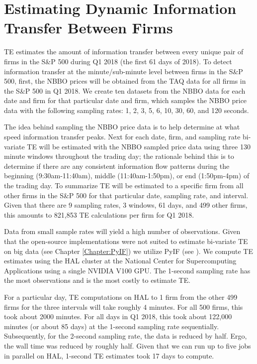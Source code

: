\section{Estimating Dynamic Information Transfer Between Firms}

TE estimates the amount of information transfer between every unique pair of firms in the S\&P 500 during Q1 2018 (the first 61 days of 2018). To detect information transfer at the minute/sub-minute level between firms in the S\&P 500, first, the NBBO prices will be obtained from the TAQ data for all firms in the S\&P 500 in Q1 2018.  We create ten datasets from the NBBO data for each date and firm for that particular date and firm, which samples the NBBO price data with the following sampling rates: 1,  2,  3,  5,  6,  10,  30,  60,  and 120 seconds.

The idea behind sampling the NBBO price data is to help determine at what speed information transfer peaks.  Next for each date,  firm, and sampling rate bi-variate TE will be estimated with the NBBO sampled price data using three 130 minute windows throughout the trading day; the rationale behind this is to determine if there are any consistent information flow patterns during the beginning (9:30am-11:40am), middle (11:40am-1:50pm), or end (1:50pm-4pm) of the trading day.  To summarize TE will be estimated to a specific firm from all other firms in the S\&P 500 for that particular date,  sampling rate,  and interval.  Given that there are 9 sampling rates,  3 windows,  61 days,  and 499 other firms, this amounts to 821,853 TE calculations per firm for Q1 2018. 

Data from small sample rates will yield a high number of observations.  Given that the open-source implementations were not suited to estimate bi-variate TE on big data (see Chapter \ref{Chapter:PyIF}) we utilize PyIF (see \cite{PyIF}).  We compute TE estimates using the HAL cluster at the National Center for Supercomputing Applications using a single NVIDIA V100 GPU. The 1-second sampling rate has the most observations and is the most costly to estimate TE. 

For a particular day,  TE computations on HAL to 1 firm from the other 499 firms for the three intervals will take roughly 4 minutes.  For all 500 firms, this took about 2000 minutes.  For all days in Q1 2018, this took about 122,000 minutes (or about 85 days) at the 1-second sampling rate sequentially.   Subsequently, for the 2-second sampling rate, the data is reduced by half. Ergo, the wall time was reduced by roughly half.   Given that we can run up to five jobs in parallel on HAL, 1-second TE estimates took 17 days to compute. 

